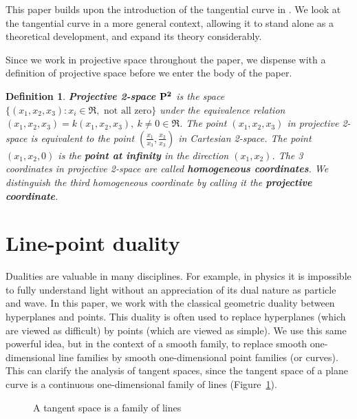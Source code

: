 \documentclass[12pt]{article}
\newtheorem{defn2}[theorem]{Definition}
\begin{document}
This paper builds upon the introduction of the tangential curve in \cite{jj01a}.
We look at the tangential curve in a more general context,
allowing it to stand alone as a theoretical development,
and expand its theory considerably.

Since we work in projective space throughout the paper,
we dispense with a definition of projective space
before we enter the body of the paper.

\begin{defn2}
\label{defn:proj}
{\bf Projective 2-space ${\bf P^2}$} is the space 
$\{(x_1,x_2,x_3) : x_i \in \Re, \mbox{ not all zero}\}$
under the equivalence relation $(x_1,x_2,x_3) = k(x_1,x_2,x_3),\ k \neq 0 \in \Re$.
The point $(x_1,x_2,x_3)$ in projective 2-space
is equivalent to the point $(\frac{x_1}{x_3},\frac{x_2}{x_3})$
in Cartesian 2-space.
The point $(x_1,x_2,0)$ is the {\bf point at infinity} in the direction $(x_1,x_2)$.
The 3 coordinates in projective 2-space are called {\bf homogeneous coordinates}.
We distinguish the third homogeneous coordinate by calling it the 
{\bf projective coordinate}.
\end{defn2}


\section{Line-point duality}
\label{sec:duality}

Dualities are valuable in many disciplines.
For example, in physics it is impossible to fully understand light without
an appreciation of its dual nature as particle and wave.
In this paper, 
we work with the classical geometric duality between hyperplanes and points.
This duality is often used to replace hyperplanes (which are viewed as difficult)
by points (which are viewed as simple).
We use this same powerful idea, but in the context of a smooth family,
to replace smooth one-dimensional line families by smooth one-dimensional
point families (or curves).
This can clarify the analysis of tangent spaces,
since the tangent space of a plane curve is a continuous one-dimensional
family of lines (Figure~\ref{fig:linefamily}).

\begin{figure}[h]
\centerline{}
\caption{A tangent space is a family of lines}
\label{fig:linefamily}
\end{figure}
\end{document}
